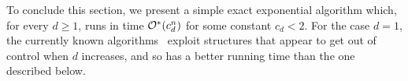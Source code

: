 
\medskip

To conclude this section, we present a simple exact exponential algorithm which, for every $d \geq 1$, runs in time $\mathcal{O}^*\!\left(c_d^n\right)$ for some constant $c_d < 2$.
For the case $d=1$, the currently known algorithms~\cite{matching_cut_tcs,matching_cut_ipec} exploit structures that appear to get out of control when $d$ increases, and so has a better running time than the one described below.


